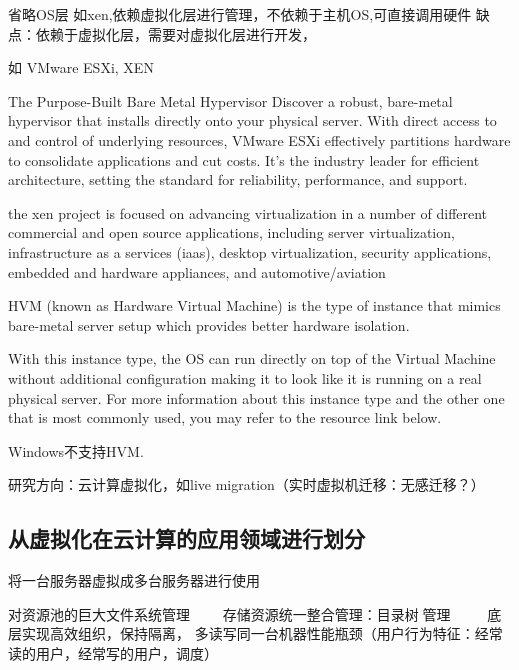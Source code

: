 省略OS层 如xen,依赖虚拟化层进行管理，不依赖于主机OS,可直接调用硬件 缺点：依赖于虚拟化层，需要对虚拟化层进行开发， 

如 VMware ESXi, XEN

\begin{definition}
    The Purpose-Built Bare Metal Hypervisor
Discover a robust, bare-metal hypervisor that installs directly onto your physical server. With direct access to and control of underlying resources, VMware ESXi effectively partitions hardware to consolidate applications and cut costs. It's the industry leader for efficient architecture, setting the standard for reliability, performance, and support.
\end{definition}

\begin{definition}[Xen]
    the xen project is focused on advancing virtualization in a number of different commercial and open source applications, including server virtualization, infrastructure as a services (iaas), desktop virtualization, security applications, embedded and hardware appliances, and automotive/aviation
\end{definition}

\begin{definition}
    HVM (known as Hardware Virtual Machine) is the type of instance that mimics bare-metal server setup which provides better hardware isolation. 
    
    With this instance type, the OS can run directly on top of the Virtual Machine without additional configuration making it to look like it is running on a real physical server. For more information about this instance type and the other one that is most commonly used, you may refer to the resource link below.
\end{definition}

\begin{remark}
    Windows不支持HVM.
\end{remark}

研究方向：云计算虚拟化，如live migration（实时虚拟机迁移：无感迁移？）


\subsection{从虚拟化在云计算的应用领域进行划分}
\begin{definition}[服务器虚拟化]
    将一台服务器虚拟成多台服务器进行使用

    对资源池的巨大文件系统管理 
　　存储资源统一整合管理：目录树🌲管理
　　🔀底层实现高效组织，保持隔离，
多‍‍‍读写同一台机器性能瓶颈（用户行为特征：经常读的用户，经常写的用户，调度）
\end{definition}

